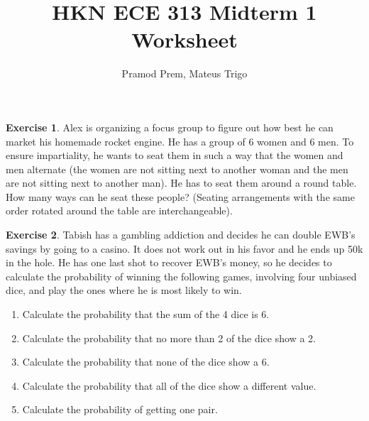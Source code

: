 \documentclass[12pt]{amsart}
\title{HKN ECE 313 Midterm 1 Worksheet}
\author{Pramod Prem, Mateus Trigo}
\theoremstyle{definition}
\newtheorem{exercise}{Exercise}
\numberwithin{equation}{section}
\theoremstyle{plain}
\begin{document}
\maketitle

\begin{exercise}
\newline
Alex is organizing a focus group to figure out how best he can market his homemade rocket engine. He has a group of 6 women and 6 men. To ensure impartiality, he wants to seat them in such a way that the women and men alternate (the women are not sitting next to another woman and the men are not sitting next to another man). He has to seat them around a round table. How many ways can he seat these people? (Seating arrangements with the same order rotated around the table are interchangeable).
\end{exercise}

\begin{exercise}
\newline
Tabish has a gambling addiction and decides he can double EWB's savings by going to a casino. It does not work out in his favor and he ends up 50k in the hole. He has one last shot to recover EWB's money, so he decides to calculate the probability of winning the following games, involving four unbiased dice, and play the ones where he is most likely to win.
\begin{enumerate}[label=\Alph*.]
    \item Calculate the probability that the sum of the 4 dice is 6.
    \item Calculate the probability that no more than 2 of the dice show a 2.
    \item Calculate the probability that none of the dice show a 6.
    \item Calculate the probability that all of the dice show a different value.
    \item Calculate the probability of getting one pair.
\end{enumerate}
\end{exercise}
\end{document}
